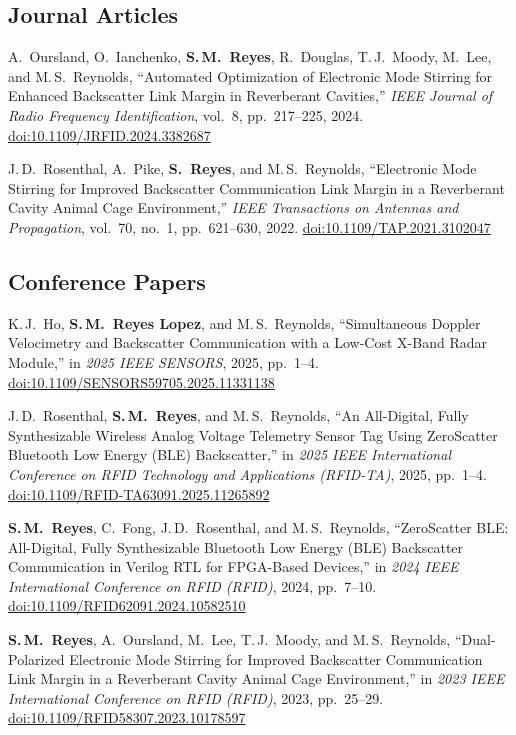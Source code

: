 \documentclass[11pt,letterpaper]{article}
\newenvironment{publist}[1]{\begin{enumerate}[label={[#1\arabic*]}, leftmargin=2.6em, itemsep=4pt]}{\end{enumerate}}
\newcommand{\me}[1]{\textbf{#1}}   %
\begin{document}
\subsection{Journal Articles}
\begin{publist}{J}
  \item A.\ Oursland, O.\ Ianchenko, \me{S.\,M.\ Reyes}, R.\ Douglas, T.\,J.\ Moody, M.\ Lee, and M.\,S.\ Reynolds,
        ``Automated Optimization of Electronic Mode Stirring for Enhanced Backscatter Link Margin in Reverberant Cavities,''
        \textit{IEEE Journal of Radio Frequency Identification}, vol.~8, pp.~217--225, 2024.
        \href{https://doi.org/10.1109/JRFID.2024.3382687}{doi:10.1109/JRFID.2024.3382687}
  \item J.\,D.\ Rosenthal, A.\ Pike, \me{S.\ Reyes}, and M.\,S.\ Reynolds,
        ``Electronic Mode Stirring for Improved Backscatter Communication Link Margin in a Reverberant Cavity Animal Cage Environment,''
        \textit{IEEE Transactions on Antennas and Propagation}, vol.~70, no.~1, pp.~621--630, 2022.
        \href{https://doi.org/10.1109/TAP.2021.3102047}{doi:10.1109/TAP.2021.3102047}
\end{publist}

\subsection{Conference Papers}
\begin{publist}{C}
  \item K.\,J.\ Ho, \me{S.\,M.\ Reyes Lopez}, and M.\,S.\ Reynolds,
        ``Simultaneous Doppler Velocimetry and Backscatter Communication with a Low-Cost X-Band Radar Module,''
        in \textit{2025 IEEE SENSORS}, 2025, pp.~1--4.
        \href{https://doi.org/10.1109/SENSORS59705.2025.11331138}{doi:10.1109/SENSORS59705.2025.11331138}
  \item J.\,D.\ Rosenthal, \me{S.\,M.\ Reyes}, and M.\,S.\ Reynolds,
        ``An All-Digital, Fully Synthesizable Wireless Analog Voltage Telemetry Sensor Tag Using ZeroScatter Bluetooth Low Energy (BLE) Backscatter,''
        in \textit{2025 IEEE International Conference on RFID Technology and Applications (RFID-TA)}, 2025, pp.~1--4.
        \href{https://doi.org/10.1109/RFID-TA63091.2025.11265892}{doi:10.1109/RFID-TA63091.2025.11265892}
  \item \me{S.\,M.\ Reyes}, C.\ Fong, J.\,D.\ Rosenthal, and M.\,S.\ Reynolds,
        ``ZeroScatter BLE: All-Digital, Fully Synthesizable Bluetooth Low Energy (BLE) Backscatter Communication in Verilog RTL for FPGA-Based Devices,''
        in \textit{2024 IEEE International Conference on RFID (RFID)}, 2024, pp.~7--10.
        \href{https://doi.org/10.1109/RFID62091.2024.10582510}{doi:10.1109/RFID62091.2024.10582510}
  \item \me{S.\,M.\ Reyes}, A.\ Oursland, M.\ Lee, T.\,J.\ Moody, and M.\,S.\ Reynolds,
        ``Dual-Polarized Electronic Mode Stirring for Improved Backscatter Communication Link Margin in a Reverberant Cavity Animal Cage Environment,''
        in \textit{2023 IEEE International Conference on RFID (RFID)}, 2023, pp.~25--29.
        \href{https://doi.org/10.1109/RFID58307.2023.10178597}{doi:10.1109/RFID58307.2023.10178597}
\end{publist}
\end{document}
